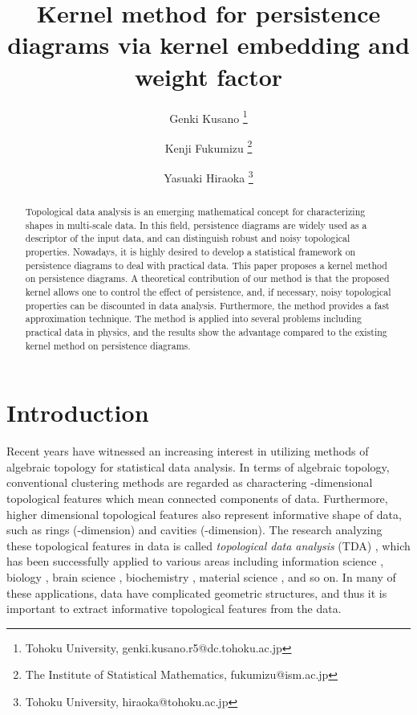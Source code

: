\documentclass{article}
\title{Kernel method for persistence diagrams via kernel embedding and weight factor}
\author{Genki Kusano \thanks{Tohoku University, genki.kusano.r5@dc.tohoku.ac.jp}
\and Kenji Fukumizu \thanks{The Institute of Statistical Mathematics, fukumizu@ism.ac.jp}
\and Yasuaki Hiraoka \thanks{Tohoku University, hiraoka@tohoku.ac.jp}}
\date{}
\begin{document}
\maketitle




\begin{abstract}

Topological data analysis is an emerging mathematical concept for characterizing shapes in multi-scale data. In this field, persistence diagrams are widely used as a descriptor of the input data, and can distinguish robust and noisy topological properties.  
Nowadays, it is highly desired to develop a statistical framework on persistence diagrams to deal with practical data. 
This paper proposes a kernel method on persistence diagrams. 
A theoretical contribution of our method is that the proposed kernel allows one to control the effect of persistence, and, if necessary, noisy topological properties can be discounted in data analysis. 
Furthermore, the method provides a fast approximation technique. The method is applied into several problems including practical data in physics, and the results show the advantage compared to the existing kernel method on persistence diagrams.
\end{abstract}

\section{Introduction}
\label{sec:intro}

Recent years have witnessed an increasing interest in utilizing methods of algebraic topology for statistical data analysis.
In terms of algebraic topology, conventional clustering methods are regarded as charactering -dimensional topological features which mean connected components of data.
Furthermore, higher dimensional topological features also represent informative shape of data, such as rings (-dimension) and cavities (-dimension).
The research analyzing these topological features in data is called {\em topological data analysis} (TDA) \cite{Ca09}, which has been successfully applied to various areas including information science \cite{CIdSZ08,dSG07}, biology \cite{KZPSGP07,XW14}, brain science \cite{LCKKL11,PETCNHV14,SMISCR08}, biochemistry \cite{GHIKMN13}, material science \cite{HNHEMN16, NHHEN15, STRFH17}, and so on.
In many of these applications, data have complicated geometric structures, and thus it is important to extract informative topological features from the data.
\end{document}
